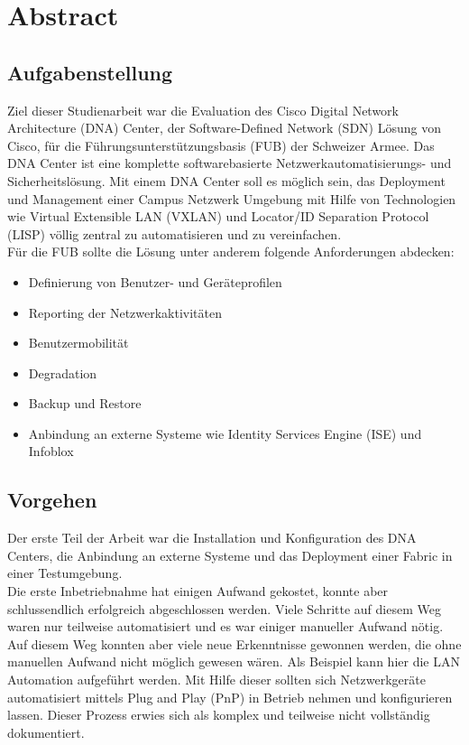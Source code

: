 \section{Abstract} 

\subsection{Aufgabenstellung} \label{Abstract}
Ziel dieser Studienarbeit war die Evaluation des Cisco Digital Network Architecture (DNA) Center, der Software-Defined Network (SDN) Lösung von Cisco, für die Führungsunterstützungsbasis (FUB) der Schweizer Armee. Das DNA Center ist eine komplette softwarebasierte Netzwerkautomatisierungs- und Sicherheitslösung. Mit einem DNA Center soll es möglich sein, das Deployment und Management einer Campus Netzwerk Umgebung mit Hilfe von Technologien wie Virtual Extensible LAN (VXLAN) und Locator/ID Separation Protocol (LISP) völlig zentral zu automatisieren und zu vereinfachen.\\
Für die FUB sollte die Lösung unter anderem folgende Anforderungen abdecken:
\begin{itemize}
	\item Definierung von Benutzer- und Geräteprofilen
	\item Reporting der Netzwerkaktivitäten
	\item Benutzermobilität
	\item Degradation
	\item Backup und Restore
	\item Anbindung an externe Systeme wie Identity Services Engine (ISE) und Infoblox
\end{itemize}

\subsection{Vorgehen}
Der erste Teil der Arbeit war die Installation und Konfiguration des DNA Centers, die Anbindung an externe Systeme und das Deployment einer Fabric in einer Testumgebung.\\

Die erste Inbetriebnahme hat einigen Aufwand gekostet, konnte aber schlussendlich erfolgreich abgeschlossen werden. Viele Schritte auf diesem Weg waren nur teilweise automatisiert und es war einiger manueller Aufwand nötig. Auf diesem Weg konnten aber viele neue Erkenntnisse gewonnen werden, die ohne manuellen Aufwand nicht möglich gewesen wären. Als Beispiel kann hier die LAN Automation aufgeführt werden. Mit Hilfe dieser sollten sich Netzwerkgeräte automatisiert mittels Plug and Play (PnP) in Betrieb nehmen und konfigurieren lassen. Dieser Prozess erwies sich als komplex und teilweise nicht vollständig dokumentiert. \\

